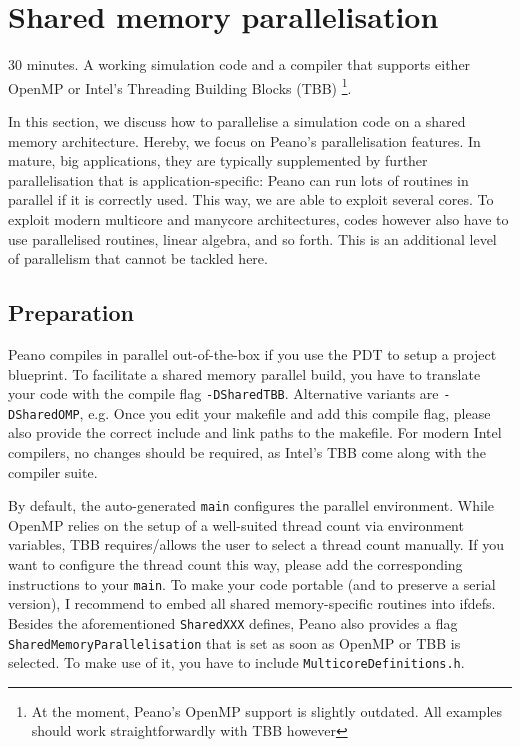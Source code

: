 \section{Shared memory parallelisation}
  \label{section:parallelisation:shared-memory}


\chapterDescription
  {
    30 minutes.
  }
  {
    A working simulation code and a compiler that supports either OpenMP or
    Intel's Threading Building Blocks (TBB) \footnote{At the moment, Peano's
    OpenMP support is slightly outdated. All examples should work straightforwardly
    with TBB however}.
  }

In this section, we discuss how to parallelise a simulation code on a shared
memory architecture.
Hereby, we focus on Peano's parallelisation features. 
In mature, big applications, they are typically supplemented by further
parallelisation that is application-specific: Peano can run lots of routines in
parallel if it is correctly used. 
This way, we are able to exploit several cores.
To exploit modern multicore and manycore architectures, codes however also have
to use parallelised routines, linear algebra, and so forth.
This is an additional level of parallelism that cannot be tackled here.

\subsection{Preparation}

Peano compiles in parallel out-of-the-box if you use the PDT to setup a project
blueprint. 
To facilitate a shared memory parallel build, you have to translate your code
with the compile flag \texttt{-DSharedTBB}. 
Alternative variants are \texttt{-DSharedOMP}, e.g.
Once you edit your makefile and add this compile flag, please also provide the
correct include and link paths to the makefile.
For modern Intel compilers, no changes should be required, as Intel's TBB come
along with the compiler suite.

By default, the auto-generated \texttt{main} configures the parallel environment. 
While OpenMP relies on the setup of a well-suited thread count via environment
variables, TBB requires/allows the user to select a thread count manually. 
If you want to configure the thread count this way, please add the corresponding
instructions to your \texttt{main}.
To make your code portable (and to preserve a serial version), I recommend to
embed all shared memory-specific routines into ifdefs.
Besides the aforementioned \texttt{SharedXXX} defines, Peano also provides a
flag \texttt{SharedMemoryParallelisation} that is set as soon as OpenMP or TBB
is selected.
To make use of it, you have to include \texttt{MulticoreDefinitions.h}.

